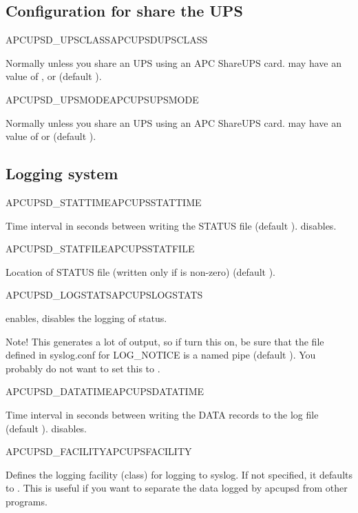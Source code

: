 \subsection{Configuration for share the UPS}

\begin {description}

 {APCUPSD\_UPSCLASS}{APCUPSDUPSCLASS}

   Normally  unless you share an UPS using an APC ShareUPS card.
    may have an value of
   ,  or  
   (default ).


 {APCUPSD\_UPSMODE}{APCUPSUPSMODE}

   Normally  unless you share an UPS using an APC ShareUPS card.
    may have an value of
    or  
   (default ).

\end {description}

\subsection{Logging system}

\begin {description}

 {APCUPSD\_STATTIME}{APCUPSSTATTIME}
 
  Time interval in seconds between writing the STATUS file 
  (default ).  disables.


 {APCUPSD\_STATFILE}{APCUPSSTATFILE}
 
 Location of STATUS file (written only if 
  is non-zero)
 (default ).


 {APCUPSD\_LOGSTATS}{APCUPSLOGSTATS}

   enables,  disables the logging of status.
  
  Note! This generates a lot of output, so if turn this on, be sure that the
  file defined in syslog.conf for LOG\_NOTICE is a named pipe (default ).
  You probably do not want to set this to .


 {APCUPSD\_DATATIME}{APCUPSDATATIME}
 
   Time interval in seconds between writing the DATA records to
   the log file (default ).  disables.
   


 {APCUPSD\_FACILITY}{APCUPSFACILITY}
 
  Defines the logging facility (class) for logging to syslog. 
  If not specified, it defaults to .
  This is useful if you want to separate the data logged by apcupsd from other
  programs.

\end {description}


